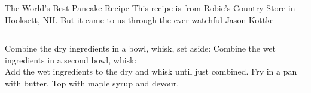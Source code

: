 \begin{recipe}{The World's Best Pancake Recipe}{}{}
\freeform This recipe is from Robie's Country Store in Hooksett,
NH. But it came to us through the ever watchful Jason
Kottke\\
\rule{\textwidth}{0.05pt}
Combine the dry ingredients in a bowl, whisk, set aside:
Combine the wet ingredients in a second bowl, whisk:
\newline
\\
Add the wet ingredients to the dry and whisk until just combined. Fry
in a pan with butter. Top with maple syrup and devour.
\end{recipe}
